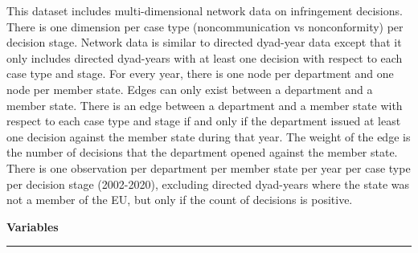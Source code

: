 \documentclass[10pt]{article}
\newcommand{\dividerline}{{\color{gray!10} \rule[4pt] {\textwidth}{3pt}}}
\newcommand{\subheading}[1]{
\vspace{24pt}
{\color{themecolor} \fontsize{14}{14}\selectfont \textbf{#1}}
\vspace{6pt}
\dividerline
\vspace{-20pt}
}
\begin{document}
\begin{flushleft}
This dataset includes multi-dimensional network data on infringement decisions. There is one dimension per case type (noncommunication vs nonconformity) per decision stage. Network data is similar to directed dyad-year data except that it only includes directed dyad-years with at least one decision with respect to each case type and stage. For every year, there is one node per department and one node per member state. Edges can only exist between a department and a member state. There is an edge between a department and a member state with respect to each case type and stage if and only if the department issued at least one decision against the member state during that year. The weight of the edge is the number of decisions that the department opened against the member state. There is one observation per department per member state per year per case type per decision stage (2002-2020), excluding directed dyad-years where the state was not a member of the EU, but only if the count of decisions is positive.

\subheading{Variables}


\end{flushleft}
\end{document}
